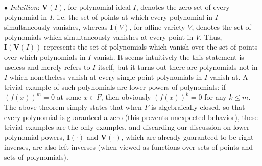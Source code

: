 \documentclass{article}
\newcommand*{\ti}{\textit}
\newcommand*{\V}{\ensuremath{\mathbf{V}}}
\newcommand*{\I}{\ensuremath{\mathbf{I}}}
\begin{document}
\indent $ \bullet $ \ti{Intuition}: $ \V(I) $, for polynomial ideal $ I $, denotes the zero set of every polynomial in $ I $, i.e. the set of points at which every polynomial in $ I $ simultaneously vanishes, whereas $ \I(V) $, for affine variety $ V $, denotes the set of polynomials which simultaneously vanishes at every point in $ V $. Thus, $ \I(\V(I)) $ represents the set of polynomials which vanish over the set of points over which polynomials in $ I $ vanish. It seems intuitively the this statement is useless and merely refers to $ I $ itself, but it turns out there are polynomials not in $ I $ which nonetheless vanish at every single point polynomials in $ I $ vanish at. A trivial example of such polynomials are lower powers of polynomials: if $ (f(x))^m = 0 $ at some $ x \in F $, then obviously $ (f(x))^k = 0 $ for any $ k \leq m $. The above theorem simply states that when $ F $ is algebraically closed, so that every polynomial is guaranteed a zero (this prevents unexpected behavior), these trivial examples are the only examples, and discarding our discussion on lower polynomial powers, $ \I(\cdot) $ and $ \V(\cdot) $, which are already guaranteed to be right inverses, are also left inverses (when viewed as functions over sets of points and sets of polynomials).
\end{document}
